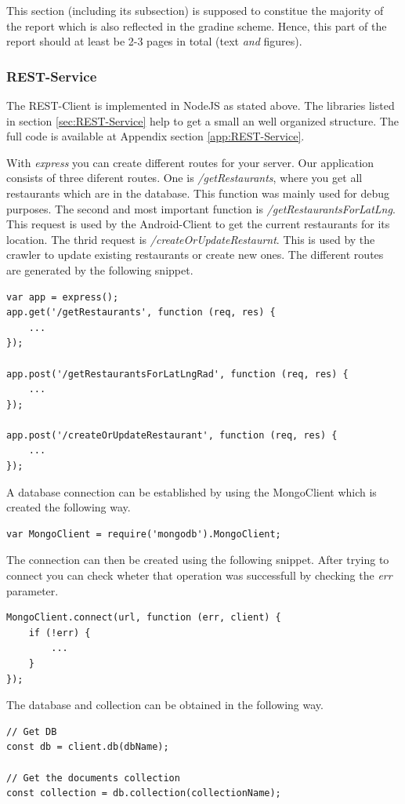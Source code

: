 This section (including its subsection) is supposed to constitue the majority
of the report which is also reflected in the gradine scheme. Hence, this part of
the report should at least be 2-3 pages in total (text \emph{and} figures).

\subsubsection{REST-Service}
The REST-Client is implemented in NodeJS as stated above. The libraries listed in section \ref{sec:REST-Service} help to get a small an well organized structure. The full code is available at Appendix section \ref{app:REST-Service}.

With \textit{express} you can create different routes for your server. Our application consists of three diferent routes. One is \textit{/getRestaurants}, where you get all restaurants which are in the database. This function was mainly used for debug purposes. The second and most important function is \textit{/getRestaurantsForLatLng}. This request is used by the Android-Client to get the current restaurants for its location. The thrid request is \textit{/createOrUpdateRestaurnt}. This is used by the crawler to update existing restaurants or create new ones. The different routes are generated by the following snippet.
\begin{lstlisting}
var app = express();
app.get('/getRestaurants', function (req, res) {
	...
});

app.post('/getRestaurantsForLatLngRad', function (req, res) {
	...
});

app.post('/createOrUpdateRestaurant', function (req, res) {
	...
});
\end{lstlisting}

A database connection can be established by using the MongoClient which is created the following way.
\begin{lstlisting}
var MongoClient = require('mongodb').MongoClient;
\end{lstlisting} 

The connection can then be created using the following snippet. After trying to connect you can check wheter that operation was successfull by checking the \textit{err} parameter.
\begin{lstlisting}
MongoClient.connect(url, function (err, client) {
	if (!err) {
		...
	}
});
\end{lstlisting}

The database and collection can be obtained in the following way.
\begin{lstlisting}
// Get DB
const db = client.db(dbName);

// Get the documents collection
const collection = db.collection(collectionName);
\end{lstlisting}

